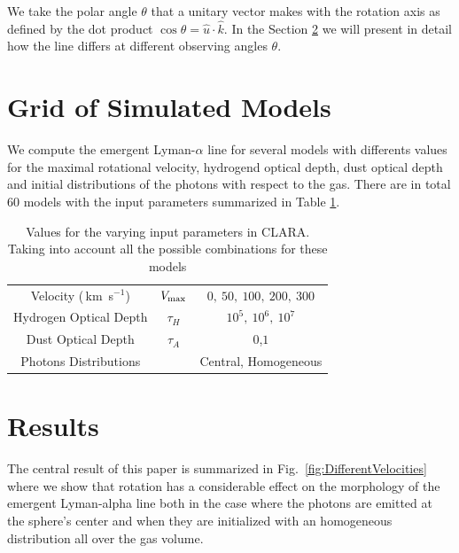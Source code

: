 \documentclass[usenatbib]{mn2e}
\newcommand{\kms}{\,km~s$^{-1}$}
\begin{document}
We take the polar angle $\theta$ that a unitary vector makes with the
rotation axis as defined by the dot product $\cos\theta =
{\hat{u}\cdot\hat{k}}$. In the Section \ref{sec:results} we will
present in detail how the line differs at different observing angles
$\theta$. 



\section{Grid of Simulated Models}
\label{sec:models}

We compute the emergent Lyman-$\alpha$ line for several models with
differents values for the maximal rotational velocity, hydrogend optical
depth, dust optical depth and initial distributions of the photons
with respect to the gas. There are in total 60 models with the input
parameters summarized in Table  \ref{table:models}. 

\begin{table}
\begin{center}
\begin{tabular}{ccc}\hline
Velocity (\kms) & $V_{\rm max}$&$0,\ 50,\ 100,\ 200,\ 300$\\
Hydrogen Optical Depth & $\tau_{H} $ & $10^{5},\ 10^{6},\ 10^{7}$\\
Dust Optical Depth & $\tau_{A}$ & $0$,$1$\\
Photons Distributions & & Central, Homogeneous\\
\hline
\end{tabular}
\caption{
Values for the varying input parameters in CLARA. Taking into account
all the possible combinations for these models
} 
\label{table:models}
\end{center}
\end{table}







\section{Results}
\label{sec:results}

The central result of this paper is summarized in
Fig.~\ref{fig:DifferentVelocities} where we show that rotation has a
considerable effect on the morphology of the emergent Lyman-alpha line
both in the case where the photons are emitted at the sphere's center
and when they are initialized with an homogeneous distribution all
over the gas volume.
\end{document}
